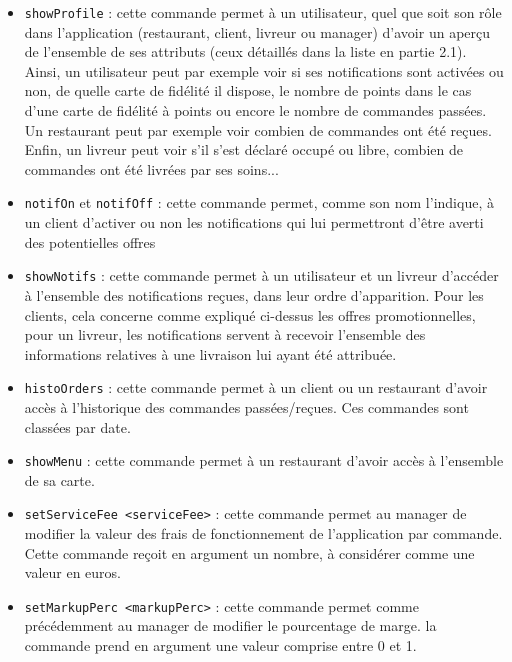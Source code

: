 \begin{itemize}
    \item \texttt{showProfile} : cette commande permet à un utilisateur, quel que soit son rôle dans l'application (restaurant, client, livreur ou manager) d'avoir un aperçu de l'ensemble de ses attributs (ceux détaillés dans la liste en partie 2.1). Ainsi, un utilisateur peut par exemple voir si ses notifications sont activées ou non, de quelle carte de fidélité il dispose, le nombre de points dans le cas d'une carte de fidélité à points ou encore le nombre de commandes passées. Un restaurant peut par exemple voir combien de commandes ont été reçues. Enfin, un livreur peut voir s'il s'est déclaré occupé ou libre, combien de commandes ont été livrées par ses soins... \\
    \item \texttt{notifOn} et \texttt{notifOff} : cette commande permet, comme son nom l'indique, à un client d'activer ou non les notifications qui lui permettront d'être averti des potentielles offres\\
    \item \texttt{showNotifs} : cette commande permet à un utilisateur et un livreur d'accéder à l'ensemble des notifications reçues, dans leur ordre d'apparition. Pour les clients, cela concerne comme expliqué ci-dessus les offres promotionnelles, pour un livreur, les notifications servent à recevoir l'ensemble des informations relatives à une livraison lui ayant été attribuée. \\
    \item \texttt{histoOrders} : cette commande permet à un client ou un restaurant d'avoir accès à l'historique des commandes passées/reçues. Ces commandes sont classées par date. \\
    \item \texttt{showMenu} : cette commande permet à un restaurant d'avoir accès à l'ensemble de sa carte. \\
    \item \texttt{setServiceFee <serviceFee>} : cette commande permet au manager de modifier la valeur des frais de fonctionnement de l'application par commande. Cette commande reçoit en argument un nombre, à considérer comme une valeur en euros.\\
    \item \texttt{setMarkupPerc <markupPerc>} : cette commande permet comme précédemment au manager de modifier le pourcentage de marge. la commande prend en argument une valeur comprise entre 0 et 1.\\

\end{itemize}
